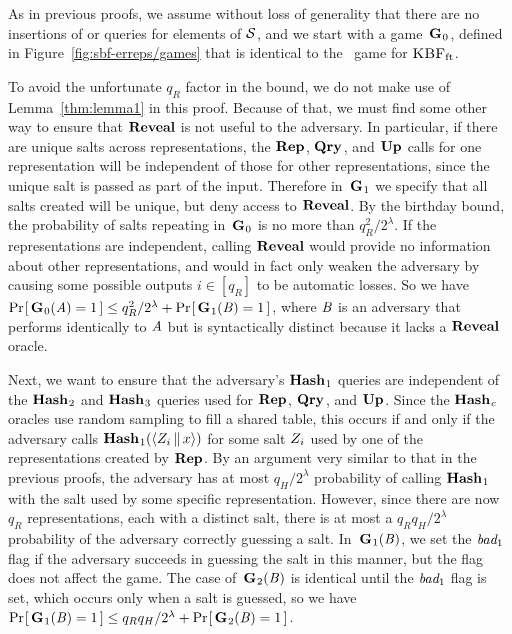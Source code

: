 As in previous proofs, we assume without loss of generality that there are no
insertions of or queries for elements of $\mathcal{S}$, and we start with a
game~$\textup{\textbf{G}}\hspace{0.5pt}_0$, defined in Figure~\ref{fig:sbf-erreps/games} that is identical to the \erreps\ game for $\textnormal{\textsc{KBF}}_\mathrm{ft}$.

To avoid the unfortunate $q_R$ factor in the bound, we do not make use of
Lemma~\ref{thm:lemma1} in this proof. Because of that, we must find some other
way to ensure that $\mathbf{Reveal}$ is not useful to the adversary. In particular, if
there are unique salts across representations, the $\textup{\textbf{Rep}}\hspace{0.5pt}$, $\textup{\textbf{Qry}}\hspace{0.5pt}$, and $\textup{\textbf{Up}}\hspace{0.5pt}$
calls for one representation will be independent of those for other
representations, since the unique salt is passed as part of the input. Therefore
in~$\textup{\textbf{G}}\hspace{0.5pt}_1$ we specify that all salts created will be unique, but deny access
to $\mathbf{Reveal}$. By the birthday bound, the probability of salts repeating
in~$\textup{\textbf{G}}\hspace{0.5pt}_0$ is no more than $q_R^2/2^\lambda$. If the representations are
independent, calling $\mathbf{Reveal}$ would provide no information about other
representations, and would in fact only weaken the adversary by causing some
possible outputs $i \in [q_R]$ to be automatic losses. So we have
$\Pr\hspace{-1pt}\left[\,\textup{\textbf{G}}\hspace{0.5pt}_0(\mathit{A}) = 1\,\right] \le q_R^2/2^\lambda + \Pr\hspace{-1pt}\left[\,\textup{\textbf{G}}\hspace{0.5pt}_1(\mathit{B}) = 1\,\right]$,
where $\mathit{B}$ is an adversary that performs identically to $\mathit{A}$ but is
syntactically distinct because it lacks a $\mathbf{Reveal}$ oracle.

Next, we want to ensure that the adversary's $\textup{\textbf{Hash}}\hspace{0.5pt}_1$ queries are independent
of the $\textup{\textbf{Hash}}\hspace{0.5pt}_2$ and $\textup{\textbf{Hash}}\hspace{0.5pt}_3$ queries used for $\textup{\textbf{Rep}}\hspace{0.5pt}$, $\textup{\textbf{Qry}}\hspace{0.5pt}$, and $\textup{\textbf{Up}}\hspace{0.5pt}$.
Since the $\textup{\textbf{Hash}}\hspace{0.5pt}_c$ oracles use random sampling to fill a shared table, this
occurs if and only if the adversary calls
$\textup{\textbf{Hash}}\hspace{0.5pt}_1(\langle Z_i \, \| \, x\rangle)$
for some salt $Z_i$ used by one of the representations created by $\textup{\textbf{Rep}}\hspace{0.5pt}$.
By an argument very similar to that in the previous proofs, the adversary has at
most $q_H/2^\lambda$ probability of calling $\textup{\textbf{Hash}}\hspace{0.5pt}_1$ with the salt used by
some specific representation. However, since there are now $q_R$
representations, each with a distinct salt, there is at most a
$q_Rq_H/2^\lambda$ probability of the adversary correctly guessing a salt.
In~$\textup{\textbf{G}}\hspace{0.5pt}_1(\mathit{B})$, we set the $\textit{bad}_1$ flag if the adversary succeeds in
guessing the salt in this manner, but the flag does not affect the game. The
case of~$\textup{\textbf{G}}\hspace{0.5pt}_2(\mathit{B})$ is identical until the $\textit{bad}_1$ flag is set, which
occurs only when a salt is guessed, so we have $\Pr\hspace{-1pt}\left[\,\textup{\textbf{G}}\hspace{0.5pt}_1(\mathit{B}) = 1\,\right] \le
q_Rq_H/2^\lambda + \Pr\hspace{-1pt}\left[\,\textup{\textbf{G}}\hspace{0.5pt}_2(\mathit{B}) = 1\,\right]$.

